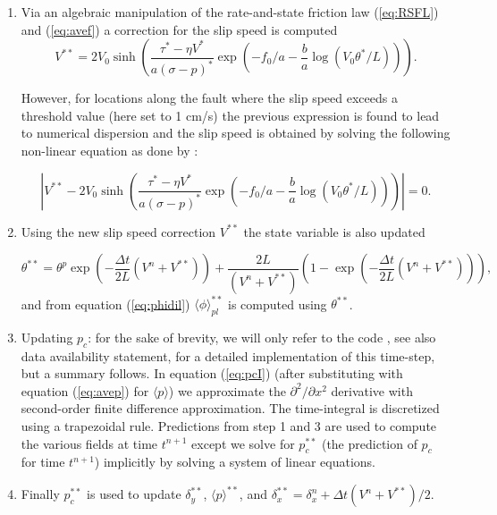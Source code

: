 \documentclass[draft]{agujournal2019}
\begin{document}
\begin{enumerate}
\item Via an algebraic manipulation of the rate-and-state friction law (\ref{eq:RSFL}) and (\ref{eq:avef}) a correction for the slip speed is computed
\begin{equation}
    {V}^{**} = 2 V_0 \sinh \left( \frac{{\tau}^* - \eta V^*}{a (\sigma - p)^*} \exp \left( - f_0/a - \frac{b}{a}\log(V_0 {\theta}^*/L) \right) \right).
    \label{eq:FLn}
\end{equation}

However, for locations along the fault where the slip speed exceeds a threshold value (here set to 1 cm/s) the previous expression is found to lead to numerical dispersion and the slip speed is obtained by solving the following non-linear equation as done by :
 
 \begin{equation}
    \left|     {V}^{**} - 2 V_0 \sinh \left( \frac{{\tau}^* - \eta V^*}{a (\sigma - p)^*} \exp \left( - f_0/a - \frac{b}{a}\log(V_0 {\theta}^*/L) \right) \right) \right| = 0 .
    \label{eq:FLnim}
\end{equation}


\item Using the new slip speed correction $V^{**}$ the state variable is also updated

\begin{equation}
    \theta^{**} = \theta^p \exp \left( - \frac{\Delta t}{2 L} (V^n + V^{**})  \right) + \frac{2 L}{(V^n + V^{**})} \left( 1 - \exp \left( - \frac{\Delta t}{2 L} (V^n + V^{**})  \right)  \right),
\end{equation}
and from equation (\ref{eq:phidil}) $\langle \phi \rangle_{pl}^{**}$ is computed using $\theta^{**}$.

\item Updating $p_c$: for the sake of brevity, we will only refer to the code \cite{elias_rafn_heimisson_Poro_SBIM}, see also data availability statement, for a detailed implementation of this time-step, but a summary follows. In equation (\ref{eq:pcI}) (after substituting with equation (\ref{eq:avep}) for $\langle p \rangle$) we approximate the $\partial^2/\partial x^2$ derivative with second-order finite difference approximation. The time-integral is discretized using a trapezoidal rule. Predictions from step 1 and 3 are used to compute the various fields at time $t^{n+1}$ except we solve for $p_c^{**}$ (the prediction of $p_c$ for time $t^{n+1}$) implicitly by solving a system of linear equations. 

\item Finally $p_c^{**}$ is used to update $\delta_{y}^{**}$, $\langle p \rangle ^{**}$, and $\delta_x^{**} = \delta_x^{n} + \Delta t (V^n + V^{**})/2$.

\end{enumerate}
\end{document}
